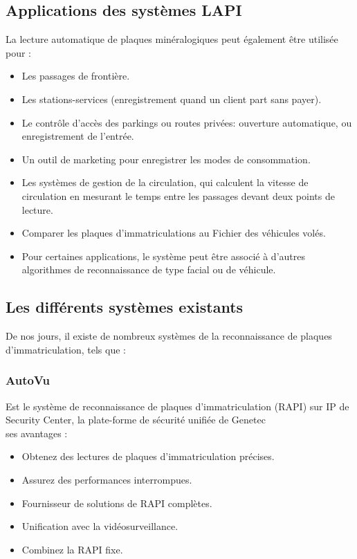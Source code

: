 \documentclass[11pt]{report}
\begin{document}
\subsection{Applications des systèmes LAPI}
La lecture automatique de plaques minéralogiques peut également être
utilisée pour :
\begin{itemize}
	\item Les passages de frontière.
	\item Les stations-services (enregistrement quand un client part sans payer).
	\item Le contrôle d'accès des parkings ou routes privées: ouverture automatique, ou
	enregistrement de l'entrée.
	\item Un outil de marketing pour enregistrer les modes de consommation.
	\item Les systèmes de gestion de la circulation, qui calculent la vitesse de
	circulation en mesurant le temps entre les passages devant deux points de
	lecture.
	\item Comparer les plaques d'immatriculations au Fichier des véhicules volés.
	\item Pour certaines applications, le système peut être associé à d'autres algorithmes
	de
	reconnaissance de type facial ou de véhicule.
\end{itemize}
\subsection{Les différents systèmes existants}
De nos jours, il existe de nombreux systèmes de la reconnaissance de plaques
d’immatriculation, tels que :
\subsubsection{AutoVu}
Est le système de reconnaissance de plaques d’immatriculation (RAPI) sur IP
de Security Center, la plate-forme de sécurité unifiée de Genetec\\
ses avantages :
\begin{itemize}
\item Obtenez des lectures de plaques d’immatriculation précises.
\item Assurez des performances interrompues.
\item
Fournisseur de solutions de RAPI complètes.
\item
Unification avec la vidéosurveillance.
\item
Combinez la RAPI fixe.
\end{itemize}
\end{document}
